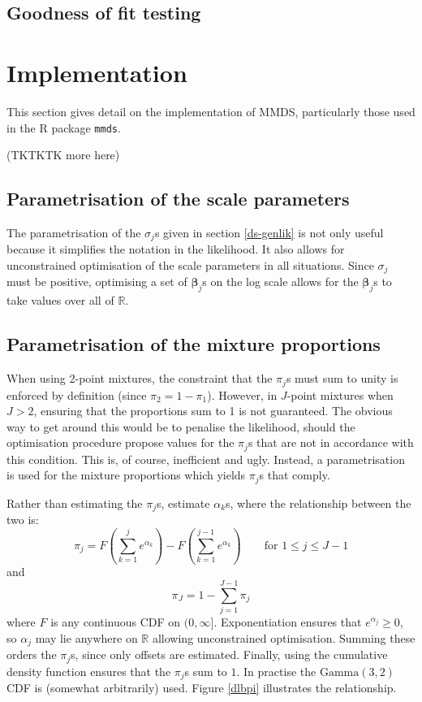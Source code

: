 \subsection{Goodness of fit testing}





\section{Implementation}
This section gives detail on the implementation of MMDS, particularly those used in the \textsf{R} package \texttt{mmds}.

(TKTKTK more here)

\subsection{Parametrisation of the scale parameters}
The parametrisation of the $\sigma_j$s given in section \ref{ds-genlik} is not only useful because it simplifies the notation in the likelihood. It also allows for unconstrained optimisation of the scale parameters in all situations. Since $\sigma_j$ must be positive, optimising a set of $\bm{\beta}_j$s on the log scale allows for the $\bm{\beta}_j$s to take values over all of $\mathbb{R}$.


\subsection{Parametrisation of the mixture proportions}
When using 2-point mixtures, the constraint that the $\pi_j$s must sum to unity is enforced by definition (since $\pi_2=1-\pi_1$). However, in $J$-point mixtures when $J>2$, ensuring that the proportions sum to 1 is not guaranteed. The obvious way to get around this would be to penalise the likelihood, should the optimisation procedure propose values for the $\pi_j$s that are not in accordance with this condition. This is, of course, inefficient and ugly. Instead, a parametrisation is used for the mixture proportions which yields $\pi_j$s that comply.

Rather than estimating the $\pi_j$s, estimate $\alpha_k$s, where the relationship between the two is:
\begin{equation*}
\pi_j = F(\sum_{k=1}^j e^{\alpha_k}) - F(\sum_{k=1}^{j-1} e^{\alpha_k}) \qquad \text{for } 1\leq j \leq J-1
\end{equation*}
and
\begin{equation*}
\pi_J = 1-\sum_{j=1}^{J-1} \pi_j
\end{equation*}
where $F$ is any continuous CDF on $(0,\infty]$. Exponentiation ensures that $e^{\alpha_j}\geq0$, so $\alpha_j$ may lie anywhere on $\mathbb{R}$ allowing unconstrained optimisation. Summing these orders the $\pi_j$s, since only offsets are estimated. Finally, using the cumulative density function ensures that the $\pi_j$s sum to $1$. In practise the $\text{Gamma}(3,2)$ CDF is (somewhat arbitrarily) used. Figure \ref{dlbpi} illustrates the relationship.


